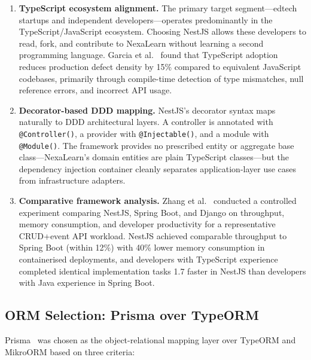 \begin{enumerate}
  \item \textbf{TypeScript ecosystem alignment.} The primary target segment---edtech startups and independent developers---operates predominantly in the TypeScript/JavaScript ecosystem. Choosing NestJS allows these developers to read, fork, and contribute to NexaLearn without learning a second programming language. Garcia et al.~\cite{garcia2022typescript} found that TypeScript adoption reduces production defect density by 15\% compared to equivalent JavaScript codebases, primarily through compile-time detection of type mismatches, null reference errors, and incorrect API usage.
  \item \textbf{Decorator-based DDD mapping.} NestJS's decorator syntax maps naturally to DDD architectural layers. A controller is annotated with \texttt{@Controller()}, a provider with \texttt{@Injectable()}, and a module with \texttt{@Module()}. The framework provides no prescribed entity or aggregate base class---NexaLearn's domain entities are plain TypeScript classes---but the dependency injection container cleanly separates application-layer use cases from infrastructure adapters.
  \item \textbf{Comparative framework analysis.} Zhang et al.~\cite{zhang2024nestjs} conducted a controlled experiment comparing NestJS, Spring Boot, and Django on throughput, memory consumption, and developer productivity for a representative CRUD+event API workload. NestJS achieved comparable throughput to Spring Boot (within 12\%) with 40\% lower memory consumption in containerised deployments, and developers with TypeScript experience completed identical implementation tasks 1.7\texttimes{} faster in NestJS than developers with Java experience in Spring Boot.
\end{enumerate}

\subsection{ORM Selection: Prisma over TypeORM}

Prisma~\cite{prisma2024} was chosen as the object-relational mapping layer over TypeORM and MikroORM based on three criteria:

